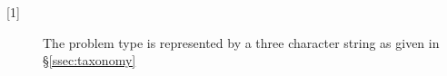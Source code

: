 \renewcommand{\descriptionlabel}[1]{\hspace{\labelsep}\texttt{#1}}
\begin{description}
\item [{[1]}]
The problem type is represented by a three character string as given
in \S\ref{ssec:taxonomy}


\end{description}
